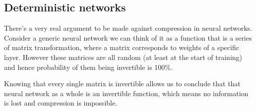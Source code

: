 \subsection{Deterministic networks}

There's a very real argument to be made against compression in neural networks.
Consider a generic neural network we can think of it as a function that is a
series of matrix transformation, where a matrix corresponds to weights of a
specific layer. However these matrices are all random (at least at the start of
training) and hence probability of them being invertible is 100\%. 

Knowing that every single matrix is invertible allows us to conclude that that
neural network as a whole is an invertible function, which means no information
is lost and compression is impossible.

